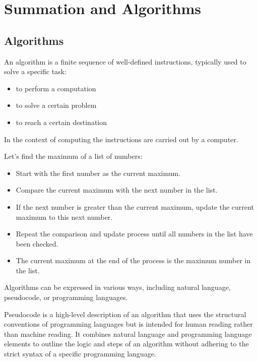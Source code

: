 \chapter{Summation and Algorithms}

\section{Algorithms}
\begin{definition}[Algorithm]
    An algorithm is a finite sequence of well-defined instructions, typically used to solve a specific task:
    \begin{itemize}[itemsep=1pt,label=$\circ$]
        \item to perform a computation
        \item to solve a certain problem
        \item to reach a certain destination
    \end{itemize}
    In the context of computing the instructions are carried out by a computer.
\end{definition}

\begin{eg}
    Let's find the maximum of a list of numbers:
    \begin{itemize}[itemsep=1pt,label=$\circ$]
        \item Start with the first number as the current maximum.
        \item Compare the current maximum with the next number in the list.
        \item If the next number is greater than the current maximum, update the current maximum to this next number.
        \item Repeat the comparison and update process until all numbers in the list have been checked.
        \item The current maximum at the end of the process is the maximum number in the list.
    \end{itemize}
\end{eg}
Algorithms can be expressed in various ways, including natural language, pseudocode, or programming languages.

\begin{definition}[Pseudocode]
    Pseudocode is a high-level description of an algorithm that uses the structural conventions of programming languages but is intended for human reading rather than machine reading. It combines natural language and programming language elements to outline the logic and steps of an algorithm without adhering to the strict syntax of a specific programming language.
\end{definition}

